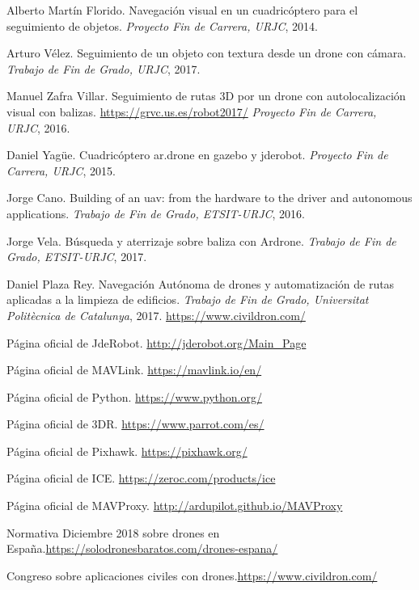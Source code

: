 \begin{thebibliography}{1}


Alberto Martín Florido. Navegación visual en un cuadricóptero para el seguimiento de objetos. 
\textit{Proyecto Fin de Carrera, URJC}, 2014.

Arturo Vélez. Seguimiento de un objeto con textura desde un drone con cámara.
\textit{Trabajo de Fin de Grado, URJC}, 2017.

Manuel Zafra Villar. Seguimiento de rutas 3D por un drone con autolocalización visual con balizas. 
\url{https://grvc.us.es/robot2017/}
\textit{Proyecto Fin de Carrera, URJC}, 2016.

Daniel Yagüe. Cuadricóptero ar.drone en gazebo y jderobot. 
\textit{Proyecto Fin de Carrera, URJC}, 2015.

Jorge Cano. Building of an uav: from the hardware to the driver and autonomous applications. 
\textit{Trabajo de Fin de Grado, ETSIT-URJC}, 2016.

Jorge Vela. Búsqueda y aterrizaje sobre baliza con Ardrone.
\textit{Trabajo de Fin de Grado, ETSIT-URJC}, 2017.

Daniel Plaza Rey. Navegación Autónoma de drones y automatización de rutas aplicadas a la limpieza de edificios.
\textit{Trabajo de Fin de Grado, Universitat Politècnica de Catalunya}, 2017.
\url{https://www.civildron.com/}

Página oficial de JdeRobot. \url{http://jderobot.org/Main_Page}

Página oficial de MAVLink. \url{https://mavlink.io/en/}

Página oficial de Python. \url{https://www.python.org/}

Página oficial de 3DR. \url{https://www.parrot.com/es/}

Página oficial de Pixhawk. \url{https://pixhawk.org/}

Página oficial de ICE. \url{https://zeroc.com/products/ice}

Página oficial de MAVProxy. \url{http://ardupilot.github.io/MAVProxy}

Normativa Diciembre 2018 sobre drones en España.\url{https://solodronesbaratos.com/drones-espana/}



Congreso sobre aplicaciones civiles con drones.\url{https://www.civildron.com/}

\end{thebibliography}